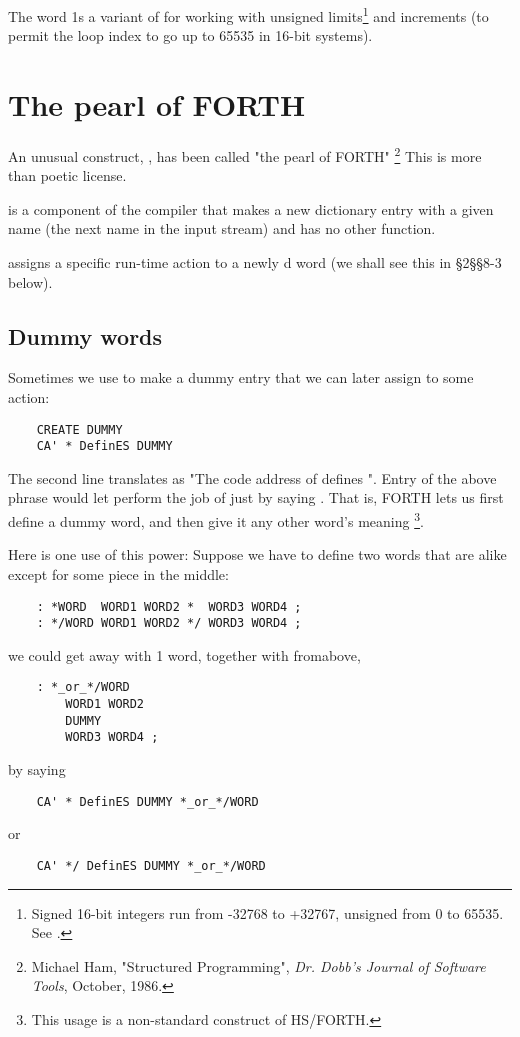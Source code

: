 The word  1s a variant of  for working with unsigned limits\footnote{Signed 16-bit integers run from -32768 to +32767, unsigned from 0 to 65535. See \FTR.} and increments (to permit the loop index to go up to 65535 in 16-bit systems).

\section{The pearl of FORTH}

An unusual construct, , has been called "the pearl of FORTH" \footnote{Michael Ham, "Structured Programming", \textit{Dr. Dobb's Journal of Software Tools}, October, 1986.} This is more than poetic license.

 is a component of the compiler that makes a new dictionary entry with a given name (the next name in the input stream) and has no other function.

 assigns a specific run-time action to a newly d word (we shall see this in §2§§8-3 below).

\subsection{Dummy words}
Sometimes we use  to make a dummy entry that we can later assign to some action:
\begin{lstlisting}
    CREATE DUMMY
    CA' * DefinES DUMMY
\end{lstlisting}

The second line translates as "The code address of \bc{*} defines ". Entry of the above phrase would let  perform the job of \bc{*} just by saying . That is, FORTH lets us first define a dummy word, and then give it any other word’s meaning \footnote{This usage is a non-standard construct of HS/FORTH.}.

Here is one use of this power: Suppose we have to define two words that are alike except for some piece in the middle:
\begin{lstlisting}
    : *WORD  WORD1 WORD2 *  WORD3 WORD4 ;
    : */WORD WORD1 WORD2 */ WORD3 WORD4 ;
\end{lstlisting}

we could get away with 1 word, together with  fromabove,

\begin{lstlisting}
    : *_or_*/WORD
        WORD1 WORD2
        DUMMY
        WORD3 WORD4 ;
\end{lstlisting}
by saying
\begin{lstlisting}
    CA' * DefinES DUMMY *_or_*/WORD
\end{lstlisting}
or
\begin{lstlisting}
    CA' */ DefinES DUMMY *_or_*/WORD
\end{lstlisting}

